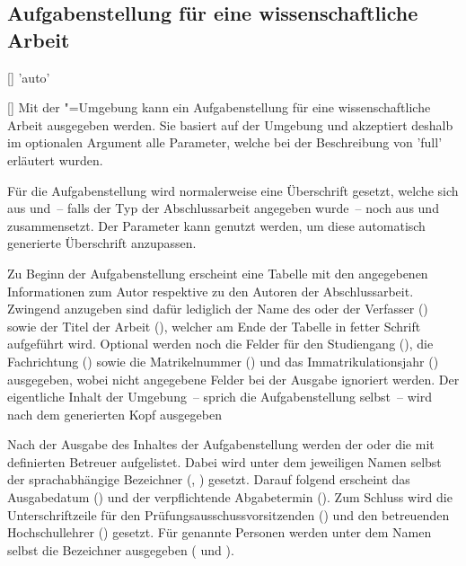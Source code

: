 \subsection{Aufgabenstellung für eine wissenschaftliche Arbeit}
\begin{Declaration}{[]}{%
  'auto'%
}
\begin{Declaration}{[]}
\printdeclarationlist%
%
%
Mit der "=Umgebung kann ein Aufgabenstellung für eine 
wissenschaftliche Arbeit ausgegeben werden. Sie basiert auf der Umgebung 
 und akzeptiert deshalb im optionalen Argument alle 
Parameter, welche bei der Beschreibung von 'full' 
erläutert wurden.

Für die Aufgabenstellung wird normalerweise eine Überschrift gesetzt, welche 
sich aus  und~-- falls der Typ der Abschlussarbeit angegeben 
wurde~-- noch aus  und  zusammensetzt. Der 
Parameter  kann genutzt werden, um diese 
automatisch generierte Überschrift anzupassen.

Zu Beginn der Aufgabenstellung erscheint eine Tabelle mit den angegebenen 
Informationen zum Autor respektive zu den Autoren der Abschlussarbeit. Zwingend 
anzugeben sind dafür lediglich der Name des oder der Verfasser () 
sowie der Titel der Arbeit (), welcher am Ende der Tabelle in 
fetter Schrift aufgeführt wird. Optional werden noch die Felder für den 
Studiengang (), die Fachrichtung () sowie die 
Matrikelnummer () und das Immatrikulationsjahr 
() ausgegeben, wobei nicht angegebene Felder bei der 
Ausgabe ignoriert werden. Der eigentliche Inhalt der Umgebung~-- sprich die 
Aufgabenstellung selbst~-- wird nach dem generierten Kopf ausgegeben

Nach der Ausgabe des Inhaltes der Aufgabenstellung werden der oder die mit 
 definierten Betreuer aufgelistet. Dabei wird unter dem 
jeweiligen Namen selbst der sprachabhängige Bezeichner (, 
) gesetzt. Darauf folgend erscheint das Ausgabedatum 
() und der verpflichtende Abgabetermin (). Zum 
Schluss wird die Unterschriftzeile für den Prüfungsausschussvorsitzenden 
() und den betreuenden Hochschullehrer () 
gesetzt. Für genannte Personen werden unter dem Namen selbst die Bezeichner 
ausgegeben ( und ).
\end{Declaration}
\end{Declaration}

